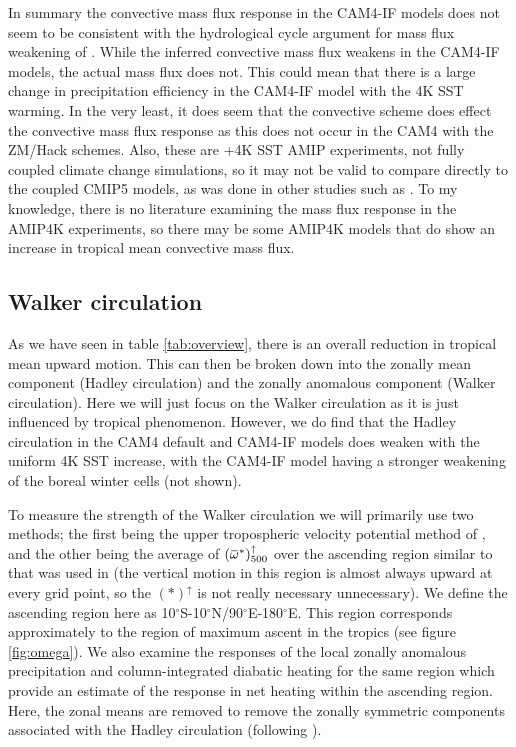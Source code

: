 \documentclass[letterpaper,12pt,titlepage,oneside,final]{book}
\newcommand{\overbar}[1]{\mkern 1.5mu\overline{\mkern-1.5mu#1\mkern-1.5mu}\mkern 1.5mu}
\begin{document}
In summary the convective mass flux response in the CAM4-IF models does not seem to be consistent with the hydrological cycle argument for mass flux weakening of \citep{held_robust_2006}. While the inferred convective mass flux weakens in the CAM4-IF models, the actual mass flux does not. This could mean that there is a large change in precipitation efficiency in the CAM4-IF model with the 4K SST warming. In the very least, it does seem that the convective scheme does effect the convective mass flux response as this does not occur in the CAM4 with the ZM/Hack schemes. Also, these are +4K SST AMIP experiments, not fully coupled climate change simulations, so it may not be valid to compare directly to the coupled CMIP5 models, as was done in other studies such as \citep{chadwick_spatial_2012}. To my knowledge, there is no literature examining the mass flux response in the AMIP4K experiments, so there may be some AMIP4K models that do show an increase in tropical mean convective mass flux.

\subsection{Walker circulation} 

As we have seen in table \ref{tab:overview}, there is an overall reduction in tropical mean upward motion. This can then be broken down into the zonally mean component (Hadley circulation) and the zonally anomalous component (Walker circulation). Here we will just focus on the Walker circulation as it is just influenced by tropical phenomenon. However, we do find that the Hadley circulation in the CAM4 default and CAM4-IF models does weaken with the uniform 4K SST increase, with the CAM4-IF model having a stronger weakening of the boreal winter cells (not shown).

To measure the strength of the Walker circulation we will primarily use two methods; the first being the upper tropospheric velocity potential method of \citep{tanaka_trend_2004}, and the other being the average of $(\overbar{\omega}^{*})_{500}^{\uparrow}$ over the ascending region similar to that was used in \citep{wills_local_2017} (the vertical motion in this region is almost always upward at every grid point, so the $(*)^{\uparrow}$ is not really necessary unnecessary). We define the ascending region here as 10$^{\circ}$S-10$^{\circ}$N/90$^{\circ}$E-180$^{\circ}$E. This region corresponds approximately to the region of maximum ascent in the tropics (see figure \ref{fig:omega}). We also examine the responses of the local zonally anomalous precipitation and column-integrated diabatic heating for the same region which provide an estimate of the response in net heating within the ascending region. Here, the zonal means are removed to remove the zonally symmetric components associated with the Hadley circulation (following \cite{wills_local_2017}).
\end{document}
